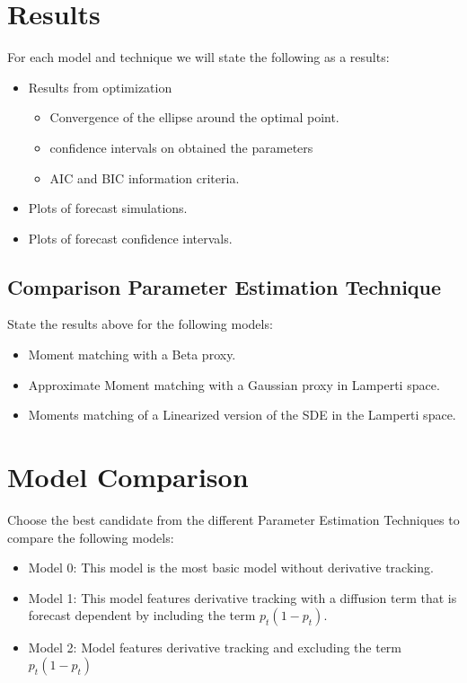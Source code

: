 \documentclass[10pt,twocolumn,letterpaper]{article}
\begin{document}
\section{Results}
For each model and technique we will state the following as a results:
\begin{itemize}
    \item Results from optimization
    \begin{itemize}
        \item Convergence of the ellipse around the optimal point.
        \item confidence intervals on obtained the parameters
        \item AIC and BIC information criteria.
    \end{itemize}
    \item Plots of forecast simulations.
    \item Plots of forecast confidence intervals.
\end{itemize}

\subsection{ Comparison Parameter Estimation Technique}
State the results above for the following models:
\begin{itemize}
    \item  Moment matching with a Beta proxy.
    \item Approximate Moment matching  with a Gaussian proxy in Lamperti space.
    \item Moments matching of a Linearized version of the SDE in the Lamperti space.
\end{itemize}

\section{Model Comparison}
Choose the best candidate from the different Parameter Estimation Techniques to compare the following models:
\begin{itemize}
  \item Model 0: This model is the most basic model without derivative tracking.

  \item Model 1: This model features derivative tracking with a diffusion term that is forecast dependent by including the term $p_t(1-p_t)$.

  \item Model 2:  Model features derivative tracking and excluding the term $p_t(1-p_t)$
\end{itemize}
\end{document}
